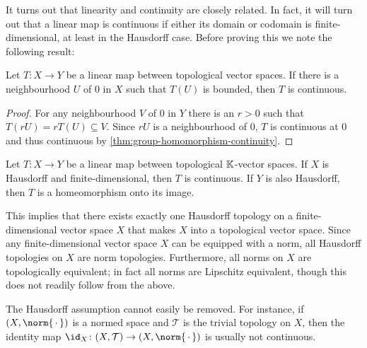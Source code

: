 \documentclass[article, a4paper, 11pt, oneside]{memoir}
\numberwithin{equation}{chapter}
\newcommand{\calT}{\mathcal{T}}
\begin{document}
It turns out that linearity and continuity are closely related. In fact, it will turn out that a linear map is continuous if either its domain or codomain is finite-dimensional, at least in the Hausdorff case. Before proving this we note the following result:

\begin{lemma}
    \label{thm:bounded-around-0-implies-continuous}
    Let $T \colon X \to Y$ be a linear map between topological vector spaces. If there is a neighbourhood $U$ of $0$ in $X$ such that $T(U)$ is bounded, then $T$ is continuous.
\end{lemma}

\begin{proof}
    For any neighbourhood $V$ of $0$ in $Y$ there is an $r > 0$ such that $T(rU) = rT(U) \subseteq V$. Since $rU$ is a neighbourhood of $0$, $T$ is continuous at $0$ and thus continuous by \cref{thm:group-homomorphism-continuity}.
\end{proof}


\begin{theorem}
    \label{thm:domain-finite-dimensional-continuity}
    Let $T \colon X \to Y$ be a linear map between topological $\mathbb{K}$-vector spaces. If $X$ is Hausdorff and finite-dimensional, then $T$ is continuous. If $Y$ is also Hausdorff, then $T$ is a homeomorphism onto its image.
\end{theorem}
%
This implies that there exists exactly one Hausdorff topology on a finite-dimensional vector space $X$ that makes $X$ into a topological vector space. Since any finite-dimensional vector space $X$ can be equipped with a norm, all Hausdorff topologies on $X$ are norm topologies. Furthermore, all norms on $X$ are topologically equivalent; in fact all norms are Lipschitz equivalent, though this does not readily follow from the above.

The Hausdorff assumption cannot easily be removed. For instance, if $(X, \norm{\,\cdot\,})$ is a normed space and $\calT$ is the trivial topology on $X$, then the identity map $\id_X \colon (X, \calT) \to (X, \norm{\,\cdot\,})$ is usually not continuous.
\end{document}

